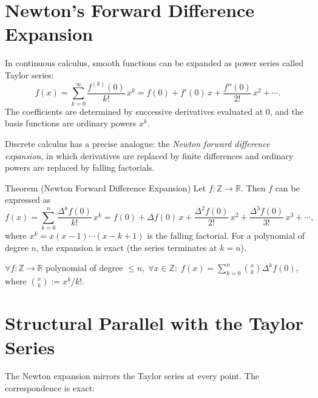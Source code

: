 
\section{Newton's Forward Difference Expansion}
\label{sec:newtons-expansion}

In continuous calculus, smooth functions can be expanded as power series
called Taylor series:
\[
f(x)
=
\sum_{k=0}^{\infty} \frac{f^{(k)}(0)}{k!}\, x^k
=
f(0) + f'(0)\,x + \frac{f''(0)}{2!}\,x^2 + \cdots.
\]
The coefficients are determined by successive derivatives evaluated at \(0\),
and the basis functions are ordinary powers \(x^k\).

Discrete calculus has a precise analogue: the \emph{Newton forward difference
expansion}, in which derivatives are replaced by finite differences and
ordinary powers are replaced by falling factorials.

\begin{theorembox}{Theorem (Newton Forward Difference Expansion)}
Let \(f : \mathbb{Z} \to \mathbb{R}\). Then \(f\) can be expressed as
\[
f(x)
=
\sum_{k=0}^{n} \frac{\Delta^k f(0)}{k!}\, x^{\underline{k}}
=
f(0)
+
\Delta f(0)\, x
+
\frac{\Delta^2 f(0)}{2!}\, x^{\underline{2}}
+
\frac{\Delta^3 f(0)}{3!}\, x^{\underline{3}}
+
\cdots,
\]
where \(x^{\underline{k}} = x(x-1)\cdots(x-k+1)\) is the falling factorial.
For a polynomial of degree \(n\), the expansion is exact (the series
terminates at \(k = n\)).
\end{theorembox}
\label{thm:newton-expansion}

\begin{remark*}
\(\forall f : \mathbb{Z}\to\mathbb{R}\) polynomial of degree \(\le n,\;
\forall x \in \mathbb{Z}:\;
f(x) = \displaystyle\sum_{k=0}^{n}\binom{x}{k}\Delta^k f(0)\),
where \(\binom{x}{k} := x^{\underline{k}}/k!\).
\end{remark*}

\section*{Structural Parallel with the Taylor Series}

The Newton expansion mirrors the Taylor series at every point. The
correspondence is exact:

